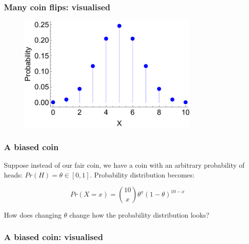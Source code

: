 \documentclass{beamer}
\begin{document}
	\begin{frame}
		\frametitle{Many coin flips: visualised}
		
		\begin{figure}[ht]
			\includegraphics[width=0.8\textwidth]{./figures/binomial_10.pdf}
		\end{figure}
		
	\end{frame}
	
	\begin{frame}
		\frametitle{A biased coin}
		
		Suppose instead of our fair coin, we have a coin with an arbitrary probability of heads: $Pr(H) = \theta\in [0, 1]$. Probability distribution becomes:
		
		\begin{equation}
		Pr(X=x) = \binom{10}{x} \theta^x (1 - \theta)^{10 - x}
		\end{equation}
		
		How does changing $\theta$ change how the probability distribution looks?
		
	\end{frame}
	
	\begin{frame}
		\frametitle{A biased coin: visualised}
		
		\begin{figure}[t]
			\centerline{}
		\end{figure}
			
	\end{frame}
	
\end{document}
